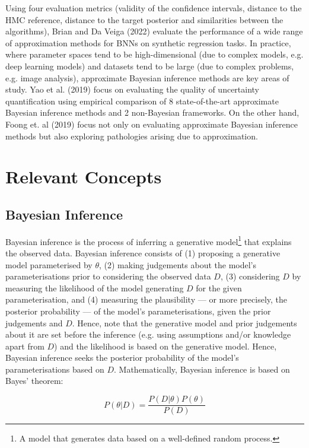 \documentclass[conference]{IEEEtran}
\begin{document}
Using four evaluation metrics (validity of the confidence intervals, distance to the HMC reference, distance to the target posterior and similarities between the algorithms), Brian and Da Veiga (2022) evaluate the performance of a wide range of approximation methods for BNNs on synthetic regression tasks. In practice, where parameter spaces tend to be high-dimensional (due to complex models, e.g. deep learning models) and datasets tend to be large (due to complex problems, e.g. image analysis), approximate Bayesian inference methods are key areas of study. Yao et al. (2019) focus on evaluating the quality of uncertainty quantification using empirical comparison of 8 state-of-the-art approximate Bayesian inference methods and 2 non-Bayesian frameworks. On the other hand, Foong et. al (2019) focus not only on evaluating approximate Bayesian inference methods but also exploring pathologies arising due to approximation.

\section{Relevant Concepts}
\subsection{Bayesian Inference}
Bayesian inference is the process of inferring a generative model\footnote{A model that generates data based on a well-defined random process.} that explains the observed data. Bayesian inference consists of (1) proposing a generative model parameterised by $\theta$, (2) making judgements about the model's parameterisations prior to considering the observed data $D$, (3) considering $D$ by measuring the likelihood of the model generating $D$ for the given parameterisation, and (4) measuring the plausibility — or more precisely, the posterior probability — of the model's parameterisations, given the prior judgements and $D$. Hence, note that the generative model and prior judgements about it are set before the inference (e.g. using assumptions and/or knowledge apart from $D$) and the likelihood is based on the generative model. Hence, Bayesian inference seeks the posterior probability of the model's parameterisations based on $D$. Mathematically, Bayesian inference is based on Bayes' theorem:

\begin{equation*}
    P(\theta|D) = \frac{P(D|\theta)P(\theta)}{P(D)}
\end{equation*}
\end{document}
